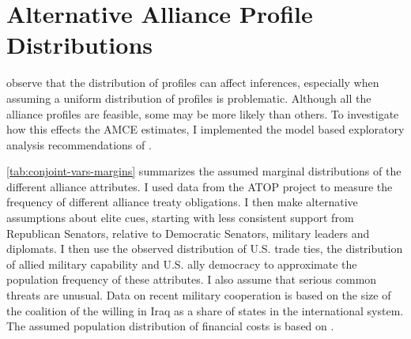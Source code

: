 \documentclass[12pt]{article}
\begin{document}
\section{Alternative Alliance Profile Distributions}


\citet{delaCuestaetal2021} observe that the distribution of profiles can affect inferences, especially when assuming a uniform distribution of profiles is problematic.
Although all the alliance profiles are feasible, some may be more likely than others. 
To investigate how this effects the AMCE estimates, I implemented the model based exploratory analysis recommendations of \citet{delaCuestaetal2021}. 


\autoref{tab:conjoint-vars-margins} summarizes the assumed marginal distributions of the different alliance attributes. 
I used data from the ATOP project \citep{Leedsetal2002} to measure the frequency of different alliance treaty obligations. 
I then make alternative assumptions about elite cues, starting with less consistent support from Republican Senators, relative to Democratic Senators, military leaders and diplomats. 
I then use the observed distribution of U.S. trade ties, the distribution of allied military capability and U.S. ally democracy to approximate the population frequency of these attributes. 
I also assume that serious common threats are unusual. 
Data on recent military cooperation is based on the size of the coalition of the willing in Iraq as a share of states in the international system. 
The assumed population distribution of financial costs is based on \citep{AlleyFuhrmann2021}. 
\end{document}
